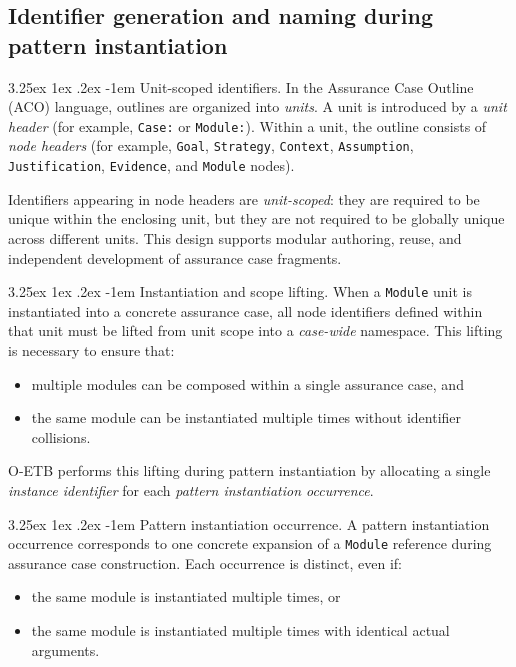 \documentclass[12pt,twoside,a4paper]{article}
\makeatletter
\renewcommand\paragraph{\@startsection{paragraph}{5}{\z@}%
  {3.25ex \@plus1ex \@minus.2ex}%
  {-1em}%
  {\normalfont\normalsize\bfseries}}
\makeatother
\begin{document}
\subsection{Identifier generation and naming during pattern instantiation}
\label{sec:aco-id-generation}

\paragraph{Unit-scoped identifiers.}
In the Assurance Case Outline (ACO) language, outlines are organized into \emph{units}.
A unit is introduced by a \emph{unit header} (for example, \texttt{Case:} or \texttt{Module:}).
Within a unit, the outline consists of \emph{node headers} (for example,
\texttt{Goal}, \texttt{Strategy}, \texttt{Context}, \texttt{Assumption},
\texttt{Justification}, \texttt{Evidence}, and \texttt{Module} nodes).

Identifiers appearing in node headers are \emph{unit-scoped}:
they are required to be unique within the enclosing unit, but they are not required
to be globally unique across different units.
This design supports modular authoring, reuse, and independent development of
assurance case fragments.

\paragraph{Instantiation and scope lifting.}
When a \texttt{Module} unit is instantiated into a concrete assurance case,
all node identifiers defined within that unit must be lifted from unit scope into
a \emph{case-wide} namespace.
This lifting is necessary to ensure that:
\begin{itemize}
  \item multiple modules can be composed within a single assurance case, and
  \item the same module can be instantiated multiple times without identifier collisions.
\end{itemize}

O-ETB performs this lifting during pattern instantiation by allocating a single
\emph{instance identifier} for each \emph{pattern instantiation occurrence}.

\paragraph{Pattern instantiation occurrence.}
A pattern instantiation occurrence corresponds to one concrete expansion of a
\texttt{Module} reference during assurance case construction.
Each occurrence is distinct, even if:
\begin{itemize}
  \item the same module is instantiated multiple times, or
  \item the same module is instantiated multiple times with identical actual arguments.
\end{itemize}
\end{document}
